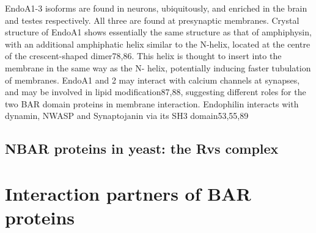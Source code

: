 \vspace{5mm}
EndoA1-3 isoforms are found in neurons, ubiquitously, and enriched in the brain and testes respectively. All three are found at presynaptic membranes. Crystal structure of EndoA1 shows essentially the same structure as that of amphiphysin, with an additional amphiphatic helix similar to the N-helix, located at the centre of the crescent-shaped dimer78,86. This helix is thought to insert into the membrane in the same way as the N- helix, potentially inducing faster tubulation of membranes. EndoA1 and 2 may interact with calcium channels at synapses, and may be involved in lipid modification87,88, suggesting different roles for the two BAR domain proteins in membrane interaction. Endophilin interacts with dynamin, NWASP and Synaptojanin via its SH3 domain53,55,89


		\subsection{NBAR proteins in yeast: the Rvs complex}		
		
		
	\section{Interaction partners of BAR proteins}
